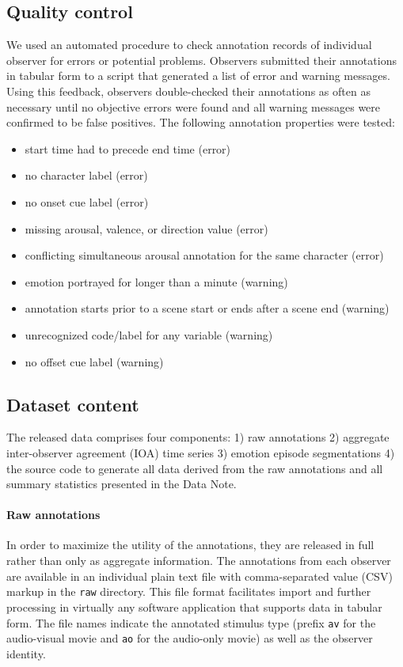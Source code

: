 \documentclass[10pt,a4paper,twocolumn]{article}
\begin{document}
\subsection*{Quality control}

We used an automated procedure to check annotation records of individual
observer for errors or potential problems. Observers submitted their
annotations in tabular form to a script that generated a list of error and
warning messages. Using this feedback, observers double-checked their
annotations as often as necessary until no objective errors were found and all
warning messages were confirmed to be false positives. The following annotation
properties were tested:

\begin{itemize}
  \item start time had to precede end time (error)
  \item no character label (error)
  \item no onset cue label (error)
  \item missing arousal, valence, or direction value (error)
  \item conflicting simultaneous arousal annotation for the same character (error)
  \item emotion portrayed for longer than a minute (warning)
  \item annotation starts prior to a scene start or ends after a scene end
    (warning)
  \item unrecognized code/label for any variable (warning)
  \item no offset cue label (warning)
\end{itemize}

\subsection*{Dataset content}

The released data comprises four components: 1) raw annotations 2) aggregate
inter-observer agreement (IOA) time series 3) emotion episode segmentations 4)
the source code to generate all data derived from the raw annotations and all
summary statistics presented in the Data Note.

\paragraph{Raw annotations} In order to maximize the utility of the annotations,
they are released in full rather than only as aggregate information. The
annotations from each observer are available in an individual plain text file
with comma-separated value (CSV) markup in the \texttt{raw} directory. This
file format facilitates import and further processing in virtually any software
application that supports data in tabular form. The file names indicate the
annotated stimulus type (prefix \texttt{av} for the audio-visual movie and
\texttt{ao} for the audio-only movie) as well as the observer identity.
\end{document}
